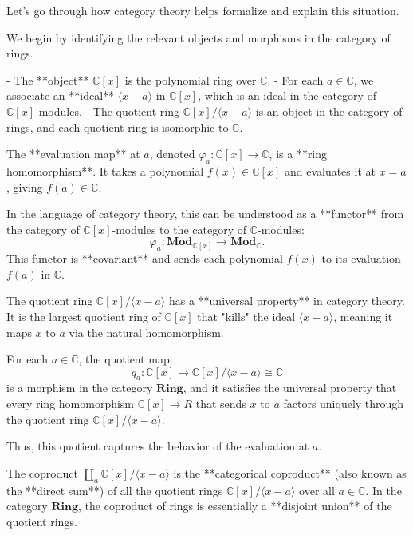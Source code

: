 \documentclass[11pt,openany]{article}
\begin{document}
Let’s go through how category theory helps formalize and explain this situation.

We begin by identifying the relevant objects and morphisms in the category of rings.

- The **object** \( \mathbb{C}[x] \) is the polynomial ring over \( \mathbb{C} \).
- For each \( a \in \mathbb{C} \), we associate an **ideal** \( \langle x - a \rangle \) in \( \mathbb{C}[x] \), which is an ideal in the category of \( \mathbb{C}[x] \)-modules.
- The quotient ring \( \mathbb{C}[x] / \langle x - a \rangle \) is an object in the category of rings, and each quotient ring is isomorphic to \( \mathbb{C} \).


The **evaluation map** at \( a \), denoted \( \varphi_a: \mathbb{C}[x] \to \mathbb{C} \), is a **ring homomorphism**. It takes a polynomial \( f(x) \in \mathbb{C}[x] \) and evaluates it at \( x = a \), giving \( f(a) \in \mathbb{C} \).

In the language of category theory, this can be understood as a **functor** from the category of \( \mathbb{C}[x] \)-modules to the category of \( \mathbb{C} \)-modules:
\[
\varphi_a: \mathbf{Mod}_{\mathbb{C}[x]} \to \mathbf{Mod}_{\mathbb{C}}.
\]
This functor is **covariant** and sends each polynomial \( f(x) \) to its evaluation \( f(a) \) in \( \mathbb{C} \).


The quotient ring \( \mathbb{C}[x] / \langle x - a \rangle \) has a **universal property** in category theory. It is the largest quotient ring of \( \mathbb{C}[x] \) that "kills" the ideal \( \langle x - a \rangle \), meaning it maps \( x \) to \( a \) via the natural homomorphism.

For each \( a \in \mathbb{C} \), the quotient map:
\[
q_a: \mathbb{C}[x] \to \mathbb{C}[x] / \langle x - a \rangle \cong \mathbb{C}
\]
is a morphism in the category \( \mathbf{Ring} \), and it satisfies the universal property that every ring homomorphism \( \mathbb{C}[x] \to R \) that sends \( x \) to \( a \) factors uniquely through the quotient ring \( \mathbb{C}[x] / \langle x - a \rangle \).

Thus, this quotient captures the behavior of the evaluation at \( a \).


The coproduct \( \coprod_a \mathbb{C}[x] / \langle x - a \rangle \) is the **categorical coproduct** (also known as the **direct sum**) of all the quotient rings \( \mathbb{C}[x] / \langle x - a \rangle \) over all \( a \in \mathbb{C} \). In the category \( \mathbf{Ring} \), the coproduct of rings is essentially a **disjoint union** of the quotient rings.
\end{document}
